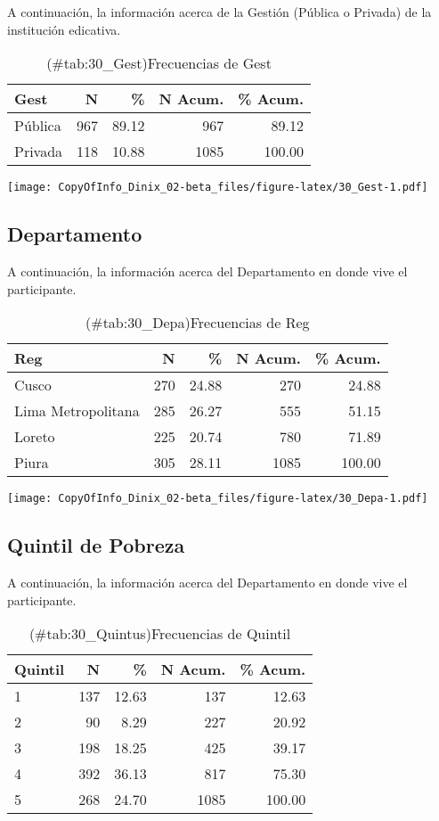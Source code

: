\documentclass[
]{article}
\begin{document}
A continuación, la información acerca de la Gestión (Pública o Privada) de la institución edicativa.

\begin{table}

\caption{(\#tab:30_Gest)Frecuencias de Gest}
\centering
\begin{tabular}[t]{lrrrr}
\toprule
Gest & N & \% & N Acum. & \% Acum.\\
\midrule
Pública & 967 & 89.12 & 967 & 89.12\\
Privada & 118 & 10.88 & 1085 & 100.00\\
\bottomrule
\end{tabular}
\end{table}

\texttt{[image: CopyOfInfo\_Dinix\_02-beta\_files/figure-latex/30\_Gest-1.pdf]}

\subsection{Departamento}\label{departamento}

A continuación, la información acerca del Departamento en donde vive el participante.

\begin{table}

\caption{(\#tab:30_Depa)Frecuencias de Reg}
\centering
\begin{tabular}[t]{lrrrr}
\toprule
Reg & N & \% & N Acum. & \% Acum.\\
\midrule
Cusco & 270 & 24.88 & 270 & 24.88\\
Lima Metropolitana & 285 & 26.27 & 555 & 51.15\\
Loreto & 225 & 20.74 & 780 & 71.89\\
Piura & 305 & 28.11 & 1085 & 100.00\\
\bottomrule
\end{tabular}
\end{table}

\texttt{[image: CopyOfInfo\_Dinix\_02-beta\_files/figure-latex/30\_Depa-1.pdf]}

\subsection{Quintil de Pobreza}\label{quintil-de-pobreza}

A continuación, la información acerca del Departamento en donde vive el participante.

\begin{table}

\caption{(\#tab:30_Quintus)Frecuencias de Quintil}
\centering
\begin{tabular}[t]{lrrrr}
\toprule
Quintil & N & \% & N Acum. & \% Acum.\\
\midrule
1 & 137 & 12.63 & 137 & 12.63\\
2 & 90 & 8.29 & 227 & 20.92\\
3 & 198 & 18.25 & 425 & 39.17\\
4 & 392 & 36.13 & 817 & 75.30\\
5 & 268 & 24.70 & 1085 & 100.00\\
\bottomrule
\end{tabular}
\end{table}
\end{document}
